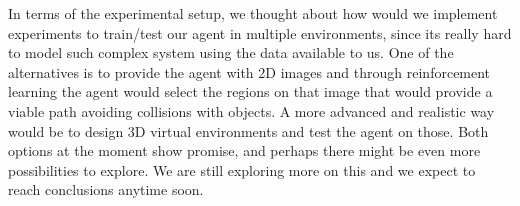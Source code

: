 \documentclass[letterpaper,10pt]{article}
\begin{document}
In terms of the experimental setup, we thought about how would we implement
experiments to train/test our agent in multiple environments, since its 
really hard to model such complex system using the data available to us. 
One of the alternatives is to provide the agent with 2D images and through 
reinforcement learning the agent would select the regions on that image that 
would provide a viable path avoiding collisions with objects. A more advanced 
and realistic way would be to design 3D virtual environments and test the 
agent on those. Both options at the moment show promise, and perhaps 
there might be even more possibilities to explore.
We are still exploring more on this and we expect to reach 
conclusions anytime soon.

\printbibliography
\end{document}
